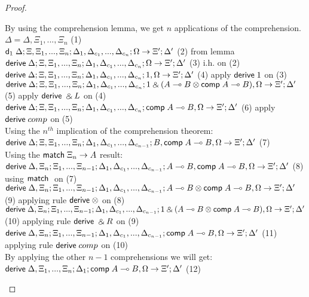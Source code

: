 \begin{proof}
\begin{itemize}
      By using the comprehension lemma, we get $n$ applications of the comprehension.\\
      $\Delta = \Delta, \Xi_1, ..., \Xi_n$ \hfill (1)\\
      $\mathsf{d}_1 \; \Delta; \Xi, \Xi_1, ..., \Xi_n; \Delta_1, \Delta_{c_1}, ..., \Delta_{c_n}; \Omega \rightarrow \Xi'; \Delta'$ \hfill (2) from lemma \\
      $\mathsf{derive} \; \Delta; \Xi, \Xi_1, ..., \Xi_n; \Delta_1, \Delta_{c_1}, ..., \Delta_{c_n}; \Omega \rightarrow \Xi'; \Delta'$ \hfill (3) i.h. on (2) \\
      $\mathsf{derive} \; \Delta; \Xi, \Xi_1, ..., \Xi_n; \Delta_1, \Delta_{c_1}, ..., \Delta_{c_n}; 1, \Omega \rightarrow \Xi'; \Delta'$ \hfill (4) apply $\mathsf{derive} \; 1$ on (3) \\
      $\mathsf{derive} \; \Delta; \Xi, \Xi_1, ..., \Xi_n; \Delta_1, \Delta_{c_1}, ..., \Delta_{c_n}; 1 \mathbin{\binampersand} (A \multimap B \otimes \mathsf{comp} \; A \multimap B), \Omega \rightarrow \Xi'; \Delta'$ \hfill (5) apply $\mathsf{derive} \; \mathbin{\binampersand} L$ on (4) \\
      $\mathsf{derive} \; \Delta; \Xi, \Xi_1, ..., \Xi_n; \Delta_1, \Delta_{c_1}, ..., \Delta_{c_n}; \mathsf{comp} \; A \multimap B, \Omega \rightarrow \Xi'; \Delta'$ \hfill (6) apply $\mathsf{derive} \; comp$ on (5) \\
      Using the $n^{th}$ implication of the comprehension theorem:\\
      $\mathsf{derive} \; \Delta; \Xi, \Xi_1, ..., \Xi_n; \Delta_1, \Delta_{c_1}, ..., \Delta_{c_{n-1}}; B, \mathsf{comp} \; A \multimap B, \Omega \rightarrow \Xi'; \Delta'$ \hfill (7) \\
      Using the $\mathsf{match} \; \Xi_n \rightarrow A$ result: \\
      $\mathsf{derive} \; \Delta, \Xi_n; \Xi_1, ..., \Xi_{n-1}; \Delta_1, \Delta_{c_1}, ..., \Delta_{c_{n-1}}; A \multimap B, \mathsf{comp} \; A \multimap B, \Omega \rightarrow \Xi'; \Delta'$ \hfill (8) using $\mathsf{match} \;$ on (7) \\
      $\mathsf{derive} \; \Delta, \Xi_n; \Xi_1, ..., \Xi_{n-1}; \Delta_1, \Delta_{c_1}, ..., \Delta_{c_{n-1}}; A \multimap B \otimes \mathsf{comp} \; A \multimap B, \Omega \rightarrow \Xi'; \Delta'$ \hfill (9) applying rule $\mathsf{derive} \; \otimes$ on (8) \\
      $\mathsf{derive} \; \Delta, \Xi_n; \Xi_1, ..., \Xi_{n-1}; \Delta_1, \Delta_{c_1}, ..., \Delta_{c_{n-1}}; 1 \mathbin{\binampersand} (A \multimap B \otimes \mathsf{comp} \; A \multimap B), \Omega \rightarrow \Xi'; \Delta'$ \hfill (10) applying rule $\mathsf{derive} \; \mathbin{\binampersand} R$ on (9) \\
      $\mathsf{derive} \; \Delta, \Xi_n; \Xi_1, ..., \Xi_{n-1}; \Delta_1, \Delta_{c_1}, ..., \Delta_{c_{n-1}}; \mathsf{comp} \; A \multimap B, \Omega \rightarrow \Xi'; \Delta'$ \hfill (11) applying rule $\mathsf{derive} \; comp$ on (10) \\
      By applying the other $n-1$ comprehensions we will get: \\
      $\mathsf{derive} \; \Delta, \Xi_1, ..., \Xi_n; \Delta_1; \mathsf{comp} \; A \multimap B, \Omega \rightarrow \Xi'; \Delta'$ \hfill (12)
   \end{itemize}
\end{proof}